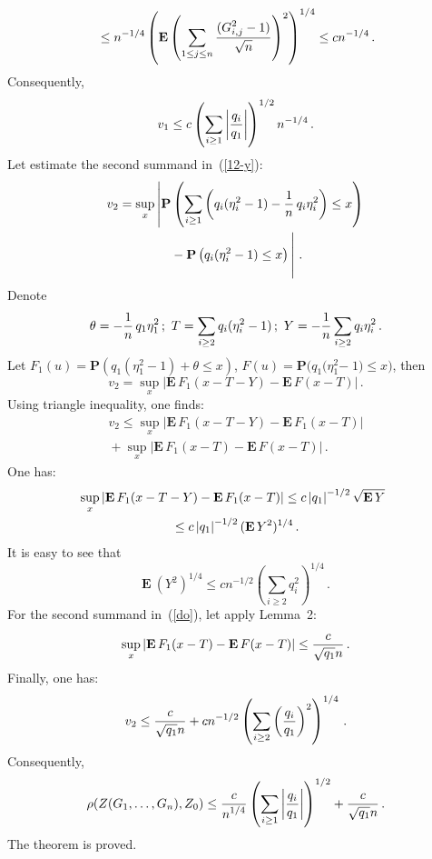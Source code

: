 \begin{multicols}{2}
\begin{multline*}
   {}\leq        n^{-1/4}\left(\mathbf{E}\left(\sum\limits_{1\leq j\leq
    n}\displaystyle\frac{\displaystyle (G_{i,j}^{2}-1)\mathstrut}{\displaystyle \sqrt{n}\mathstrut}\right)^{2}\right)^{{1}/{4}}\leq cn^{-1/4}\,.
    \end{multline*}
    Consequently,
    $$
    v_1\leq c\left(\sum\limits_{i\geq 1}\left\vert\displaystyle\frac{\displaystyle q_i\mathstrut}{\displaystyle q_1\mathstrut}\right\vert\right)^{1/2}n^{-1/4}\,.
    $$
    Let estimate the second summand in~(\ref{12-y}):
    \begin{multline*}
    v_2=\sup\limits_{x}\left\vert\mathbf{P}\left(\sum\limits_{i\geq 1}\left(q_i(\eta_i^{2}-1)-
    \fr{1}{n}\,q_i\eta_i^{2}\right)\leq x\right)\right.\\
\left.    {}-
    \mathbf{P}\left(q_i(\eta_i^{2}-1)\leq
    x\right)
    \vphantom{\fr{1}{n}\sum\limits_{i\geq 1}}\right\vert\,.
    \end{multline*}
    Denote
    $$
    \theta=-\fr{1}{n}\,q_1\eta_1^{2}\,; \
    T=\sum\limits_{i\geq 2}q_i(\eta_i^{2}-1)\,; \ 
    Y=-  \fr{1}{n}\sum\limits_{i\geq 2}q_i\eta_i^{2}\,.
    $$
    Let $F_{1}(u)=\mathbf{P}(q_1(\eta_1^{2}-1)+
    \theta\leq x)$, $F(u)=\mathbf{P}(q_1(\eta_1^{2}$\linebreak $-\;1)\leq x)$,
    then
    $$
    v_2=\sup\limits_{x}|\mathbf{E} \, F_{1}(x-T-Y)-\mathbf{E} \,
    F(x-T)|\,.
    $$
    Using triangle inequality, one finds:
\begin{multline}
\label{do}
v_2\leq \sup\limits_{x}\left\vert\mathbf{E} \, F_{1}(x-T-Y)-\mathbf{E} \,
    F_{1}(x-T)\right\vert\\
    {}+\sup\limits_{x}\left\vert\mathbf{E} \, F_{1}(x-T)-\mathbf{E} \,
    F(x-T)\right\vert\,.
    \end{multline}
    One has:
    \begin{multline*}
    \hspace*{-4pt}\sup\limits_{x}|\mathbf{E} \, F_{1}(x-T-Y)-\mathbf{E} \,
    F_{1}(x-T)|\leq c \left\vert q_1\right\vert^{-1/2}\sqrt{\mathbf{E} \, Y}\\
    {}\leq c\left\vert q_1\right\vert^{-1/2}
    (\mathbf{E} \, Y^{2})^{1/4}\,.
    \end{multline*}
    It is easy to see that
    $$
    \mathbf{E} \ (Y^{2})^{1/4}\leq  cn^{-1/2}\left(\sum_{i\geq 2}q_i^{2}\right)^{1/4}\,.
    $$
    For the second summand in~(\ref{do}), let apply Lemma~2:
    $$
    \sup\limits_{x}|\mathbf{E} \, F_{1}(x-T)-\mathbf{E} \,
    F(x-T)| \leq \displaystyle\frac{\displaystyle c\mathstrut}{\displaystyle \sqrt{q_1}n\mathstrut}\,.
    $$
    Finally, one has:
    $$
    v_2\leq \displaystyle\frac{\displaystyle c\mathstrut}{\displaystyle \sqrt{q_1}n\mathstrut}+
    cn^{-1/2}\left(\sum\limits_{i\geq 2}\left(\displaystyle\frac{\displaystyle q_i\mathstrut}{\displaystyle q_1\mathstrut}\right)^{2}\right)^{1/4}\,.
    $$
    Consequently,
    $$
    \rho(Z(G_1,\ldots,G_n),Z_0)\leq \displaystyle\frac{\displaystyle c\mathstrut}{\displaystyle n^{1/4}\mathstrut}
    \left(\sum\limits_{i\geq 1}\left\vert\displaystyle\frac{\displaystyle q_i\mathstrut}{\displaystyle q_1\mathstrut}\right\vert\right)^{1/2}+\displaystyle\frac{\displaystyle c\mathstrut}{\displaystyle \sqrt{q_1}n\mathstrut}\,.
    $$
     The theorem is proved.


\end{multicols}
